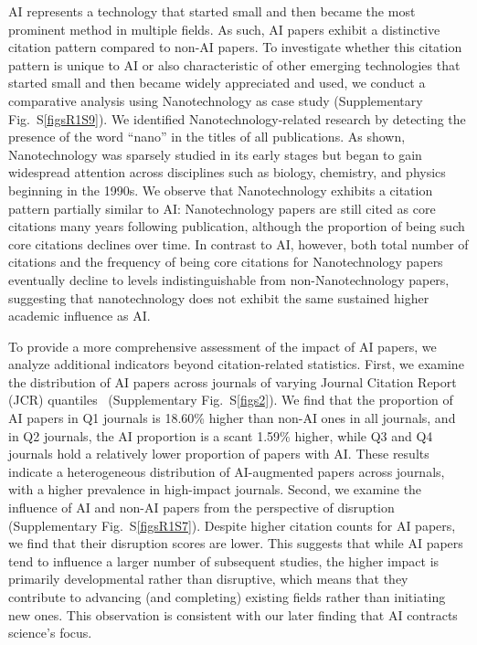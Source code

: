 AI represents a technology that started small and then became the most prominent method in multiple fields. As such, AI papers exhibit a distinctive citation pattern compared to non-AI papers.
To investigate whether this citation pattern is unique to AI or also characteristic of other emerging technologies that started small and then became widely appreciated and used, we conduct a comparative analysis using Nanotechnology as case study (Supplementary Fig.~S\ref{figsR1S9}).
We identified Nanotechnology-related research by detecting the presence of the word “nano” in the titles of all publications.
As shown, Nanotechnology was sparsely studied in its early stages but began to gain widespread attention across disciplines such as biology, chemistry, and physics beginning in the 1990s.
We observe that Nanotechnology exhibits a citation pattern partially similar to AI: Nanotechnology papers are still cited as core citations many years following publication, although the proportion of being such core citations declines over time.
In contrast to AI, however, both total number of citations and the frequency of being core citations for Nanotechnology papers eventually decline to levels indistinguishable from non-Nanotechnology papers, suggesting that nanotechnology does not exhibit the same sustained higher academic influence as AI.

To provide a more comprehensive assessment of the impact of AI papers, we analyze additional indicators beyond citation-related statistics.
First, we examine the distribution of AI papers across journals of varying Journal Citation Report (JCR) quantiles~\supercite{jcr} (Supplementary Fig.~S\ref{figs2}).
We find that the proportion of AI papers in Q1 journals is 18.60\% higher than non-AI ones in all journals, and in Q2 journals, the AI proportion is a scant 1.59\% higher, while Q3 and Q4 journals hold a relatively lower proportion of papers with AI.
These results indicate a heterogeneous distribution of AI-augmented papers across journals, with a higher prevalence in high-impact journals.
Second, we examine the influence of AI and non-AI papers from the perspective of disruption~\supercite{wu2019large,park2023papers} (Supplementary Fig.~S\ref{figsR1S7}).
Despite higher citation counts for AI papers, we find that their disruption scores are lower.
This suggests that while AI papers tend to influence a larger number of subsequent studies, the higher impact is primarily developmental rather than disruptive, which means that they contribute to advancing (and completing) existing fields rather than initiating new ones.
This observation is consistent with our later finding that AI contracts science’s focus.

